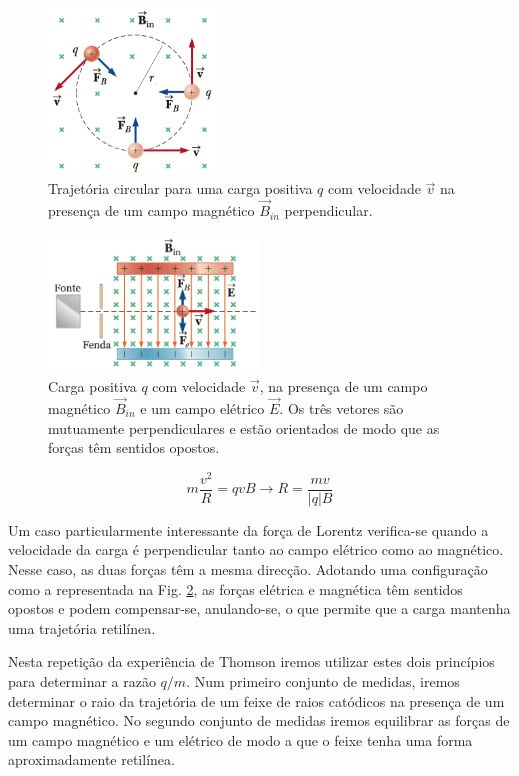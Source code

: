 \documentclass[12pt,a4paper,oneside]{paper}
\begin{document}
\begin{figure}[H]
  \centering 
	\includegraphics[width=0.4\textwidth]{./thomson_images/Lorentz1.png} 
	\caption{Trajetória circular para uma carga positiva $q$ com velocidade $\vec{v}$ na presença de um campo magnético
    $\vec{B}_{in}$ perpendicular.
    \label{fig:lorentz1}} 
\end{figure}

\begin{figure}[H]
  \centering 
	\includegraphics[width=0.5\textwidth]{./thomson_images/Lorentz2.png} 
	\caption{ Carga positiva $q$ com velocidade $\vec{v}$, na presença de um campo magnético $\vec{B}_{in}$ e um campo
    elétrico $\vec{E}$. Os três vetores são mutuamente perpendiculares e estão orientados de modo que as forças têm sentidos
    opostos.
    \label{fig:lorentz2}} 
\end{figure}

\begin{equation}
m\frac{v^2}{R}=qvB \rightarrow R=\frac{mv}{|q|B}
\end{equation}

Um caso particularmente interessante da força de Lorentz verifica-se quando a velocidade da carga é perpendicular tanto
ao campo elétrico como ao magnético. Nesse caso, as duas forças têm a mesma direcção. Adotando uma configuração como a
representada na Fig. \ref{fig:lorentz2}, as forças elétrica e magnética têm sentidos opostos e podem compensar-se,
anulando-se, o que permite que a carga mantenha uma trajetória retilínea.

Nesta repetição da experiência de Thomson iremos utilizar estes dois princípios para determinar a razão $q/m$. Num primeiro
conjunto de medidas, iremos determinar o raio da trajetória de um feixe de raios catódicos na presença de um campo magnético.
No segundo conjunto de medidas iremos equilibrar as forças de um campo magnético e um elétrico de modo a que o feixe tenha
uma forma aproximadamente retilínea.
\end{document}
